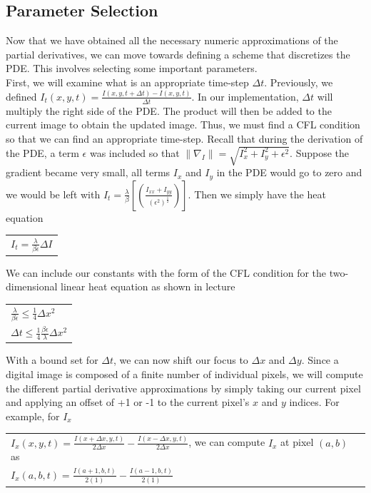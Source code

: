 \documentclass{article}
\begin{document}
  \newpage
  \subsection{Parameter Selection}
  \noindent
  Now that we have obtained all the necessary numeric approximations of the partial derivatives, we
  can move towards defining a scheme that discretizes the PDE. This involves selecting
  some important parameters.\\

  \noindent
  First, we will examine what is an appropriate time-step $\Delta t$. Previously,
  we defined $I_{t}(x,y,t) = \frac{I(x,y,t+\Delta t) - I(x,y,t)}{\Delta t}$. In our implementation,
  $\Delta t$ will multiply the right side of the PDE. The product will then be added to
  the current image to obtain the updated image. Thus, we must find a CFL condition
  so that we can find an appropriate time-step. Recall that during the derivation of
  the PDE, a term $\epsilon$ was included so that $\| \nabla_{I} \| = \sqrt{I_{x}^2 + I_{y}^2 + \epsilon^2}$.
  Suppose the gradient became very small, all terms $I_{x}$ and $I_{y}$ in the PDE would go to zero and 
  we would be left with $I_{t} = \frac{\lambda}{\beta}[(\frac{I_{xx}+I_{yy}}{(\epsilon^2)^\frac{1}{2}})]$.
  Then we simply have the heat equation
  \begin{center}
    \begin{tabular}{l}
      $I_{t} = \frac{\lambda}{\beta \epsilon}\Delta I$
    \end{tabular}
  \end{center}

  \noindent
  We can include our constants with the form of the CFL condition for the two-dimensional linear heat equation
  as shown in lecture
  \begin{center}
    \begin{tabular}{l}
      \vspace{12pt}
      $\frac{\lambda}{\beta \epsilon} \leq \frac{1}{4} \Delta x^2$\\
      $\Delta t \leq \frac{1}{4} \frac{\beta \epsilon}{\lambda} \Delta x^2$\\
    \end{tabular}
  \end{center}

  \noindent
  With a bound set for  $\Delta t$, we can now shift our focus to $\Delta x$ and $\Delta y$. Since
  a digital image is composed of a finite number of individual pixels, we will compute the different
  partial derivative approximations by simply taking our current pixel and applying an offset of
  +1 or -1 to the current pixel's $x$ and $y$ indices. For example, for $I_{x}$
  \begin{center}
    \begin{tabular}{l}
      $I_{x}(x,y,t) = \frac{I(x+\Delta x,y,t)}{2\Delta x} - \frac{I(x-\Delta x,y,t)}{2\Delta x}$, we can
      \vspace{12pt}
      compute $I_{x}$ at pixel $(a,b)$ as\\
      $I_{x}(a,b,t) = \frac{I(a+1,b,t)}{2(1)} - \frac{I(a-1,b,t)}{2(1)}$
    \end{tabular}
  \end{center}
\end{document}
